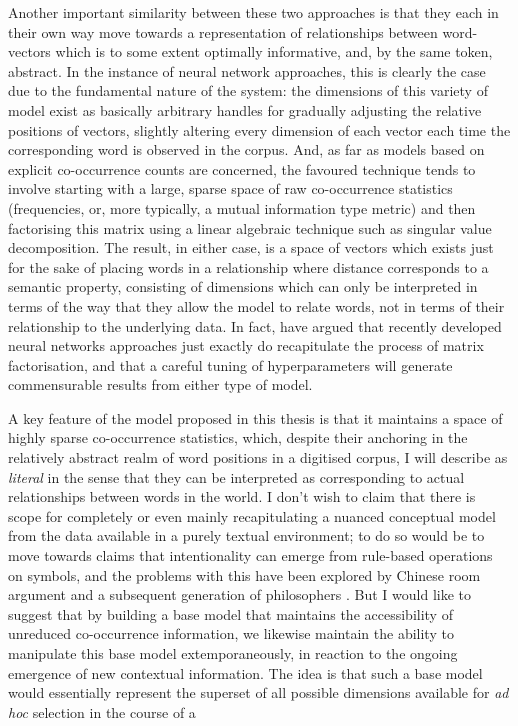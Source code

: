 {Another important similarity between these two approaches is that they each in their own way move towards a representation of relationships between word-vectors which is to some extent optimally informative, and, by the same token, abstract.  In the instance of neural network approaches, this is clearly the case due to the fundamental nature of the system: the dimensions of this variety of model exist as basically arbitrary handles for gradually adjusting the relative positions of vectors, slightly altering every dimension of each vector each time the corresponding word is observed in the corpus.  And, as far as models based on explicit co-occurrence counts are concerned, the favoured technique tends to involve starting with a large, sparse space of raw co-occurrence statistics (frequencies, or, more typically, a mutual information type metric) and then factorising this matrix using a linear algebraic technique such as singular value decomposition.  The result, in either case, is a space of vectors which exists just for the sake of placing words in a relationship where distance corresponds to a semantic property, consisting of dimensions which can only be interpreted in terms of the way that they allow the model to relate words, not in terms of their relationship to the underlying data.  In fact, \cite{LevyEA2014b} have argued that recently developed neural networks approaches just exactly do recapitulate the process of matrix factorisation, and that a careful tuning of hyperparameters will generate commensurable results from either type of model.

A key feature of the model proposed in this thesis is that it maintains a space of highly sparse co-occurrence statistics, which, despite their anchoring in the relatively abstract realm of word positions in a digitised corpus, I will describe as \emph{literal} in the sense that they can be interpreted as corresponding to actual relationships between words in the world.  I don't wish to claim that there is scope for completely or even mainly recapitulating a nuanced conceptual model from the data available in a purely textual environment; to do so would be to move towards claims that intentionality can emerge from rule-based operations on symbols, and the problems with this have been explored by  Chinese room argument and a subsequent generation of philosophers \citep{PrestonEA2002}.  But I would like to suggest that by building a base model that maintains the accessibility of unreduced co-occurrence information, we likewise maintain the ability to manipulate this base model extemporaneously, in reaction to the ongoing emergence of new contextual information.  The idea is that such a base model would essentially represent the superset of all possible dimensions available for \emph{ad hoc} selection in the course of a 

}
